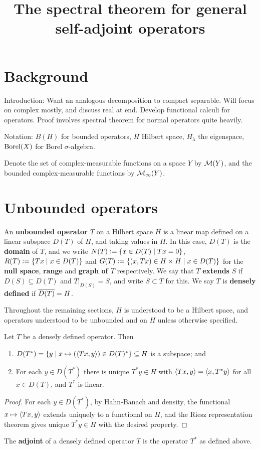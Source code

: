 \documentclass[10pt]{amsart}
\title{The spectral theorem for general self-adjoint operators}
\begin{document}
\maketitle
\section{Background}
Introduction: Want an analogous decomposition to compact separable. Will focus on complex mostly, and discuss real at end. Develop functional calculi for operators. Proof involves spectral theorem for normal operators quite heavily.

Notation: $B(H)$ for bounded operators, $H$ Hilbert space, $H_\lambda$ the eigenspace, $\operatorname{Borel}(X)$ for Borel $\sigma$-algebra. 

Denote the set of complex-measurable functions on a space $Y$ by $\mathcal{M}(Y)$, and the bounded complex-measurable functions by $\mathcal{M}_\infty(Y)$. 
\section{Unbounded operators}
An \textbf{unbounded operator $T$} on a Hilbert space $H$ is a linear map defined on a linear subspace $D(T)$ of $H$, and taking values in $H$. In this case, $D(T)$ is the \textbf{domain} of $T$, and we write $N(T) \vcentcolon= \left\{  x \in D(T) \mid Tx = 0  \right\}$, $R(T) \vcentcolon= \left\{  Tx \mid x \in D(T)  \right\}$ and $G(T) \vcentcolon= \left\{  (x, Tx) \in H \times H \mid x \in D(T)  \right\}$ for the \textbf{null space}, \textbf{range} and \textbf{graph of $T$} respectively. We say that $T$ \textbf{extends} $S$ if $D(S) \subseteq D(T)$ and $T|_{D(S)} = S$, and write $S \subset T$ for this. We say $T$ is \textbf{densely defined} if $\overline{D(T)} = H$.

Throughout the remaining sections, $H$ is understood to be a Hilbert space, and operators understood to be unbounded and on $H$ unless otherwise specified.
\begin{lemma}
    Let $T$ be a densely defined operator. Then
    \begin{enumerate}
        \item $D(T^*) = \left\{  y \mid x \mapsto (\left\langle Tx, y \right\rangle) \in D(T)^*  \right\} \subseteq H$ is a subspace; and
        \item For each $y \in D(T^*)$ there is unique $T^*y \in H$ with $\left\langle Tx, y \right\rangle = \left\langle x, T^*y \right\rangle$ for all $x \in D(T)$, and $T^*$ is linear.
    \end{enumerate}
\end{lemma}
\begin{proof}
    For each $y \in D(T^*)$, by Hahn-Banach and density, the functional $x \mapsto \left\langle Tx, y \right\rangle$ extends uniquely to a functional on $H$, and the Riesz representation theorem gives unique $T^*y \in H$ with the desired property.
\end{proof}
\begin{definition}[Adjoint]
    The \textbf{adjoint} of a densely defined operator $T$ is the operator $T^*$ as defined above. 
\end{definition}
\end{document}
